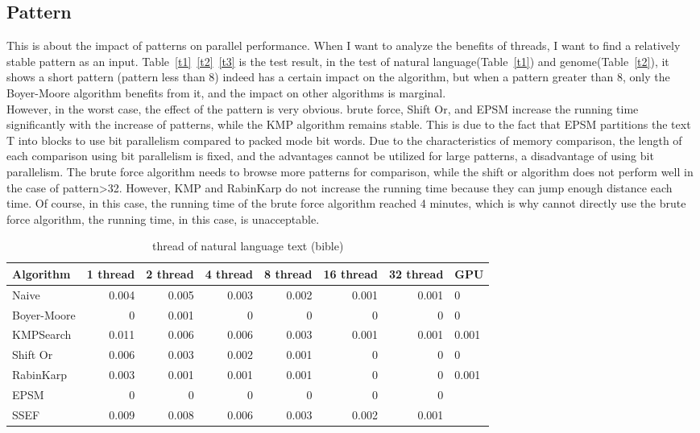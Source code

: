 \documentclass[11pt]{article}       %
\begin{document}
\subsection{Pattern}\label{pf}



This is about the impact of patterns on parallel performance. When I want to analyze the benefits of threads, I want to find a relatively stable pattern as an input. Table~\ref{t1}~\ref{t2}~\ref{t3} is the test result,  in the test of natural language(Table~\ref{t1}) and genome(Table~\ref{t2}), it shows a short pattern (pattern less than 8)  indeed has a certain impact on the algorithm, but when a pattern greater than 8, only the Boyer-Moore algorithm benefits from it, and the impact on other algorithms is marginal. \\
However, in the worst case, the effect of the pattern is very obvious. brute force, Shift Or, and EPSM increase the running time significantly with the increase of patterns, while the KMP algorithm remains stable. This is due to the fact that EPSM partitions the text T into blocks to use bit parallelism compared to packed mode bit words. Due to the characteristics of memory comparison, the length of each comparison using bit parallelism is fixed, and the advantages cannot be utilized for large patterns, a disadvantage of using bit parallelism. The brute force algorithm needs to browse more patterns for comparison, while the shift or algorithm does not perform well in the case of pattern>32. However, KMP and RabinKarp do not increase the running time because they can jump enough distance each time. Of course, in this case, the running time of the brute force algorithm reached 4 minutes, which is why cannot directly use the brute force algorithm, the running time, in this case, is unacceptable.





\begin{table}[htbp]
  \centering
  \caption{thread of natural language text (bible)}
    \begin{tabular}{lrrrrrr}\label{t4}
Algorithm & 1 thread & 2 thread & 4 thread & 8 thread & 16 thread & 32 thread & GPU \\
 \hline
    Naive & 0.004 & 0.005 & 0.003 & 0.002 & 0.001 & 0.001 & 0 \\
    {Boyer-Moore} & 0     & 0.001 & 0     & 0     & 0     & 0     & 0 \\
    KMPSearch & 0.011 & 0.006 & 0.006 & 0.003 & 0.001 & 0.001 & 0.001 \\
    Shift Or & 0.006 & 0.003 & 0.002 & 0.001 & 0     & 0     & 0 \\
    RabinKarp & 0.003 & 0.001 & 0.001 & 0.001 & 0     & 0     & 0.001 \\
    EPSM  & 0     & 0     & 0     & 0     & 0     & 0     &  \\
    SSEF  & 0.009 & 0.008 & 0.006 & 0.003 & 0.002 & 0.001 &  \\
    \end{tabular}%
  \label{tab:addlabel}%
\end{table}%
\end{document}
